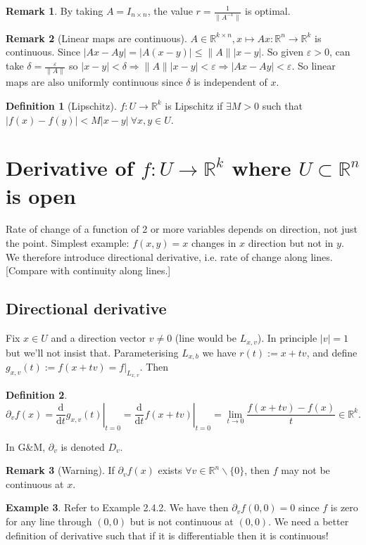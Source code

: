 \documentclass[a4paper]{article}
\theoremstyle{definition}
\newtheorem{defn}{Definition}[subsection]
\newtheorem{eg}[defn]{Example}
\newtheorem*{remark}{Remark}
\begin{document}
\begin{remark}
By taking $A=I_{n\times n}$, the value $r=\frac{1}{\|A^{-1}\|}$ is optimal.
\end{remark}
\begin{remark}[Linear maps are continuous]
$A\in \mathbb R^{k\times n},x\mapsto Ax: \mathbb R^n \rightarrow \mathbb R^k$ is continuous. Since $|Ax-Ay|=|A(x-y)|\leq \|A\||x-y|$. So given $\varepsilon >0$, can take $\delta = \frac{\varepsilon}{\|A\|}$ so $|x-y|<\delta \Rightarrow \|A\||x-y|<\varepsilon \Rightarrow |Ax-Ay|<\varepsilon$. So linear maps are also uniformly continuous since $\delta$ is independent of $x$.
\end{remark}
\begin{defn}[Lipschitz]
$f:U\rightarrow \mathbb R^k$ is Lipschitz if $\exists M>0$ such that $|f(x)-f(y)|<M|x-y| \ \forall x,y\in U$.
\end{defn}

\section{Derivative of $f:U\rightarrow \mathbb R^k$ where $U\subset \mathbb R^n$ is open}
Rate of change of a function of 2 or more variables depends on direction, not just the point. Simplest example: $f(x,y)=x$ changes in $x$ direction but not in $y$. We therefore introduce directional derivative, i.e. rate of change along lines. [Compare with continuity along lines.]
\subsection{Directional derivative}
Fix $x\in U$ and a direction vector $v\neq 0$ (line would be $L_{x,v}$). In principle $|v|=1$ but we'll not insist that. Parameterising $L_{x,b}$ we have $r(t):=x+tv$, and define $g_{x,v}(t):=f(x+tv)=\left. f\right|_{L_{x,v}}$. Then
\begin{defn}
\[
\partial_v f(x) = \left. \frac{\mathrm d}{\mathrm dt} g_{x,v}(t)\right|_{t=0}=\left. \frac{\mathrm d}{\mathrm dt}f(x+tv)\right|_{t=0} = \lim_{t\rightarrow 0} \frac{f(x+tv)-f(x)}{t} \in \mathbb R^k.
\]
\end{defn}
In G\&M, $\partial_v$ is denoted $D_v$.
\begin{remark}[Warning]
If $\partial_v f(x)$ exists $\forall v\in \mathbb R^n \backslash \{0\}$, then $f$ may not be continuous at $x$.
\end{remark}
\begin{eg}
Refer to Example 2.4.2. We have then $\partial_v f(0,0)=0$ since $f$ is zero for any line through $(0,0)$ but is not continuous at $(0,0)$. We need a better definition of derivative such that if it is differentiable then it is continuous!
\end{eg}
\end{document}
